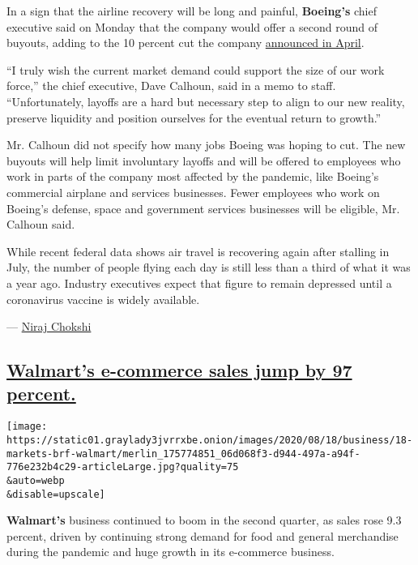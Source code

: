 In a sign that the airline recovery will be long and painful,
\textbf{Boeing's} chief executive said on Monday that the company would
offer a second round of buyouts, adding to the 10 percent cut the
company
\href{https://www.nytimes3xbfgragh.onion/2020/04/29/business/boeing-layoffs-coronavirus.html}{announced
in April}.

``I truly wish the current market demand could support the size of our
work force,'' the chief executive, Dave Calhoun, said in a memo to
staff. ``Unfortunately, layoffs are a hard but necessary step to align
to our new reality, preserve liquidity and position ourselves for the
eventual return to growth.''

Mr. Calhoun did not specify how many jobs Boeing was hoping to cut. The
new buyouts will help limit involuntary layoffs and will be offered to
employees who work in parts of the company most affected by the
pandemic, like Boeing's commercial airplane and services businesses.
Fewer employees who work on Boeing's defense, space and government
services businesses will be eligible, Mr. Calhoun said.

While recent federal data shows air travel is recovering again after
stalling in July, the number of people flying each day is still less
than a third of what it was a year ago. Industry executives expect that
figure to remain depressed until a coronavirus vaccine is widely
available.

--- \href{https://www.nytimes3xbfgragh.onion/by/niraj-chokshi}{Niraj
Chokshi}

\hypertarget{walmarts-e-commerce-sales-jump-by-97-percent}{%
\subsection{\texorpdfstring{\protect\hyperlink{walmarts-e-commerce-sales-jump-by-97-percent}{Walmart's
e-commerce sales jump by 97
percent.}}{Walmart's e-commerce sales jump by 97 percent.}}\label{walmarts-e-commerce-sales-jump-by-97-percent}}

\texttt{[image: https://static01.graylady3jvrrxbe.onion/images/2020/08/18/business/18-markets-brf-walmart/merlin\_175774851\_06d068f3-d944-497a-a94f-776e232b4c29-articleLarge.jpg?quality=75\\\&auto=webp\\\&disable=upscale]}

\textbf{Walmart's} business continued to boom in the second quarter, as
sales rose 9.3 percent, driven by continuing strong demand for food and
general merchandise during the pandemic and huge growth in its
e-commerce business.

